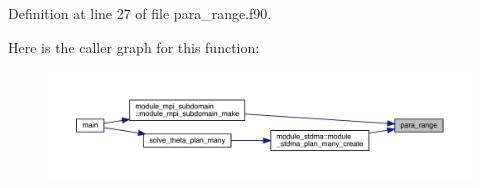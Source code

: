 Definition at line 27 of file para\+\_\+range.\+f90.

Here is the caller graph for this function\+:\nopagebreak
\begin{figure}[H]
\begin{center}
\leavevmode
\includegraphics[width=350pt]{para__range_8f90_ab75ab386311975aa4ff7cac06798fcd4_icgraph}
\end{center}
\end{figure}
